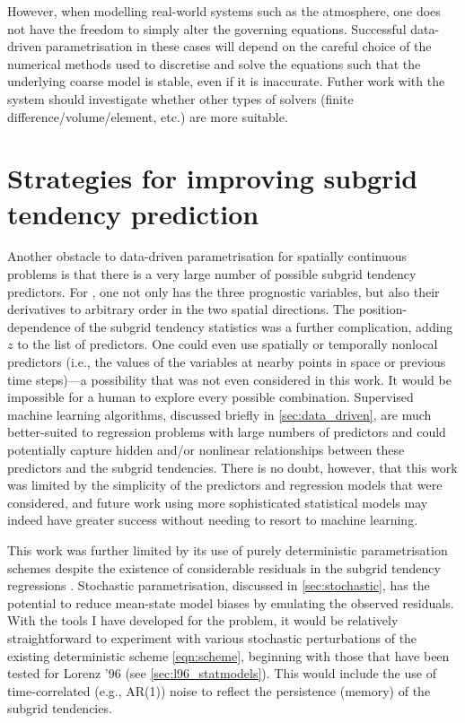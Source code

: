 \documentclass[../main.tex]{subfiles}
\begin{document}
However, when modelling real-world systems such as the atmosphere, one does
not have the freedom to simply alter the governing equations. Successful
data-driven parametrisation in these cases will depend on the careful choice of
the numerical methods used to discretise and solve the equations such that
the underlying coarse model is stable, even if it is inaccurate. Futher work
with the \rb{} system should investigate whether other types of solvers
(finite difference/volume/element, etc.) are more suitable.


\section{Strategies for improving subgrid tendency prediction}
\label{sec:improve_prediction}
Another obstacle to data-driven parametrisation for spatially continuous
problems is that there is a very large number of possible subgrid tendency
predictors. For \rb{}, one not only has the three prognostic variables, but
also their derivatives to arbitrary order in the two spatial directions. The
position-dependence of the subgrid tendency statistics was a further
complication, adding $z$ to the list of predictors. One could even use
spatially or temporally nonlocal predictors (i.e., the values of the variables
at nearby points in space or previous time steps)---a possibility that was not
even considered in this work. It would be impossible for a human to explore
every possible combination. Supervised machine learning algorithms, discussed
briefly in \cref{sec:data_driven}, are much better-suited to regression
problems with large numbers of predictors and could potentially capture hidden
and/or nonlinear relationships between these predictors and the subgrid
tendencies. There is no doubt, however, that this work was limited by the
simplicity of the predictors and regression models that were considered, and
future work using more sophisticated statistical models may indeed have greater
success without needing to resort to machine learning.

This work was further limited by its use of purely deterministic
parametrisation schemes despite the existence of considerable residuals
in the subgrid tendency regressions
. Stochastic parametrisation, discussed in
\cref{sec:stochastic}, has the potential to reduce mean-state model
biases by emulating the observed residuals. With the tools I have developed for
the \rb{} problem, it would be relatively straightforward to experiment with
various stochastic perturbations of the existing deterministic scheme
\cref{eqn:scheme}, beginning with those that have been tested for
Lorenz '96 (see \cref{sec:l96_statmodels}). This would include the use
of time-correlated (e.g., AR(1)) noise to reflect the persistence (memory)
of the subgrid tendencies.
\end{document}
